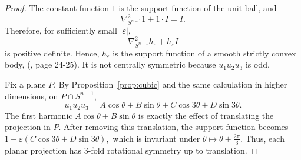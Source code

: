 \documentclass[11pt]{article}
\theoremstyle{definition}
\begin{document}
\begin{proof}
The constant function \(1\) is the support function of the unit ball, and
\[
\nabla^2_{S^{n-1}}1+1\cdot I=I.
\]
Therefore, for sufficiently small \(|\varepsilon|\),
\[
\nabla^2_{S^{n-1}}h_\varepsilon+h_\varepsilon I
\]
is positive definite. Hence, \(h_\varepsilon\) is the support function of a smooth strictly
convex body, (\cite{G}, page 24-25). It is not centrally symmetric because \(u_1u_2u_3\) is odd.

Fix a plane \(P\). By Proposition~\ref{prop:cubic} and the same calculation in higher dimensions, on \(P\cap S^{n-1}\),
\[
u_1u_2u_3=A\cos\theta+B\sin\theta+C\cos3\theta+D\sin3\theta.
\]
The first harmonic \(A\cos\theta+B\sin\theta\) is exactly the effect of translating the
projection in \(P\). After removing this translation, the support function becomes
$
1+\varepsilon(C\cos3\theta+D\sin3\theta),
$
which is invariant under
$
\theta\mapsto\theta+\frac{2\pi}{3}.
$
Thus, each planar projection has \(3\)-fold rotational symmetry up to translation.
\end{proof}

	
	
	
	
	
	
	
	
	
	
	
	
	
	
	
	
	
	
	
	
	
	
	
	
	
	
	
	
	
	
	
	
	
	
	
	
	
	
\end{document}
